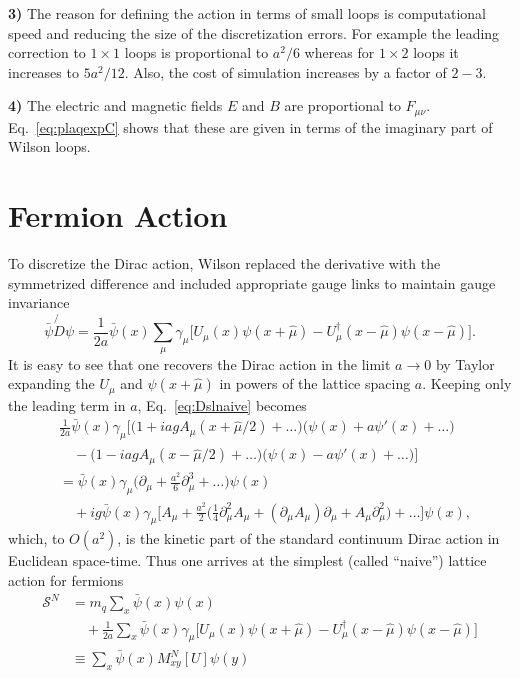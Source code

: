 \textbf{3)} The reason for defining the action in terms of small loops is
computational speed and reducing the size of the discretization errors. For
example the leading correction to $1\times1$ loops is proportional to
$a^2/6$ whereas for $1\times2$ loops it increases to $5a^2/12$. Also, the
cost of simulation increases by a factor of $2-3$.

\textbf{4)} The electric and magnetic fields $E$ and $B$ are proportional
to $F_{\mu\nu}$. Eq.~\ref{eq:plaqexpC} shows that these are given in terms
of the imaginary part of Wilson loops.

\section{Fermion Action}

To discretize the Dirac action, Wilson replaced the derivative with the
symmetrized difference and included appropriate gauge links to maintain
gauge invariance
\begin{equation}
\label{eq:Dslnaive}
\bar\psi\not{D}\psi = \frac{1}{2a}\bar\psi(x)\sum_\mu\gamma_\mu
\big[ U_\mu(x)\psi(x+\hat{\mu}) - U_\mu^\dagger(x-\hat{\mu})
      \psi(x-\hat{\mu}) \big] .
\end{equation}
It is easy to see that one recovers the Dirac action in the limit $a \to 0$
by Taylor expanding the $U_\mu$ and $\psi(x+\hat{\mu})$ in powers of the
lattice spacing $a$. Keeping only the leading term in $a$,
Eq.~\ref{eq:Dslnaive} becomes
\[
\begin{aligned}
&\frac{1}{2a}\bar\psi(x)\gamma_\mu\Big[
   \big(1+iagA_\mu(x+\hat{\mu}/2)+\ldots\big)
   \big(\psi(x)+a\psi'(x)+\ldots\big) \\
&\quad - \big(1-iagA_\mu(x-\hat{\mu}/2)+\ldots\big)
   \big(\psi(x)-a\psi'(x)+\ldots\big) \Big] \\
&= \bar\psi(x)\gamma_\mu\Big(\partial_\mu + \frac{a^2}{6}\partial_\mu^3 +
   \ldots\Big)\psi(x) \\
&\quad + ig\bar\psi(x)\gamma_\mu\Big[A_\mu + \frac{a^2}{2}\Big(
   \frac{1}{4}\partial_\mu^2 A_\mu + (\partial_\mu A_\mu)\partial_\mu +
   A_\mu\partial_\mu^2\Big) + \ldots \Big]\psi(x) ,
\end{aligned}
\]
which, to $O(a^2)$, is the kinetic part of the standard continuum Dirac
action in Euclidean space-time. Thus one arrives at the simplest (called
``naive'') lattice action for fermions
\begin{equation}
\label{eq:naiveact}
\begin{aligned}
\mathcal{S}^N &= m_q\sum_x\bar\psi(x)\psi(x) \\
&\quad + \frac{1}{2a}\sum_x\bar\psi(x)\gamma_\mu\big[
   U_\mu(x)\psi(x+\hat{\mu}) - U_\mu^\dagger(x-\hat{\mu})
   \psi(x-\hat{\mu}) \big] \\
&\equiv \sum_x\bar\psi(x)M_{xy}^N[U]\psi(y)
\end{aligned}
\end{equation}
